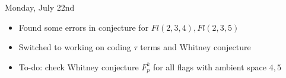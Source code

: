 Monday, July 22nd
\begin{itemize}
    \item Found some errors in conjecture for $Fl(2, 3, 4), Fl(2, 3, 5)$
    \item Switched to working on coding $\tau$ terms and Whitney conjecture
    \item To-do: check Whitney conjecture $F_p^k$ for all flags with ambient space $4, 5$
\end{itemize}